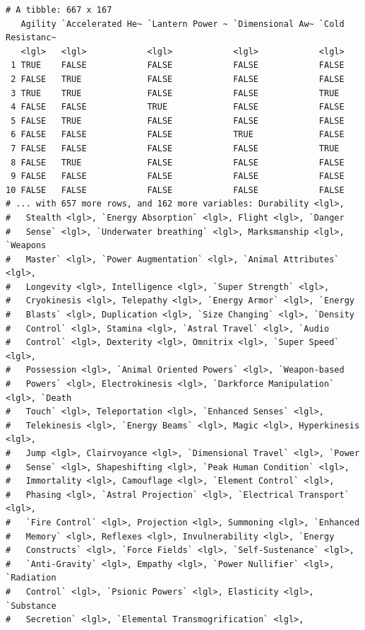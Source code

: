 \documentclass[
]{book}
\begin{document}
\begin{verbatim}
# A tibble: 667 x 167
   Agility `Accelerated He~ `Lantern Power ~ `Dimensional Aw~ `Cold Resistanc~
   <lgl>   <lgl>            <lgl>            <lgl>            <lgl>           
 1 TRUE    FALSE            FALSE            FALSE            FALSE           
 2 FALSE   TRUE             FALSE            FALSE            FALSE           
 3 TRUE    TRUE             FALSE            FALSE            TRUE            
 4 FALSE   FALSE            TRUE             FALSE            FALSE           
 5 FALSE   TRUE             FALSE            FALSE            FALSE           
 6 FALSE   FALSE            FALSE            TRUE             FALSE           
 7 FALSE   FALSE            FALSE            FALSE            TRUE            
 8 FALSE   TRUE             FALSE            FALSE            FALSE           
 9 FALSE   FALSE            FALSE            FALSE            FALSE           
10 FALSE   FALSE            FALSE            FALSE            FALSE           
# ... with 657 more rows, and 162 more variables: Durability <lgl>,
#   Stealth <lgl>, `Energy Absorption` <lgl>, Flight <lgl>, `Danger
#   Sense` <lgl>, `Underwater breathing` <lgl>, Marksmanship <lgl>, `Weapons
#   Master` <lgl>, `Power Augmentation` <lgl>, `Animal Attributes` <lgl>,
#   Longevity <lgl>, Intelligence <lgl>, `Super Strength` <lgl>,
#   Cryokinesis <lgl>, Telepathy <lgl>, `Energy Armor` <lgl>, `Energy
#   Blasts` <lgl>, Duplication <lgl>, `Size Changing` <lgl>, `Density
#   Control` <lgl>, Stamina <lgl>, `Astral Travel` <lgl>, `Audio
#   Control` <lgl>, Dexterity <lgl>, Omnitrix <lgl>, `Super Speed` <lgl>,
#   Possession <lgl>, `Animal Oriented Powers` <lgl>, `Weapon-based
#   Powers` <lgl>, Electrokinesis <lgl>, `Darkforce Manipulation` <lgl>, `Death
#   Touch` <lgl>, Teleportation <lgl>, `Enhanced Senses` <lgl>,
#   Telekinesis <lgl>, `Energy Beams` <lgl>, Magic <lgl>, Hyperkinesis <lgl>,
#   Jump <lgl>, Clairvoyance <lgl>, `Dimensional Travel` <lgl>, `Power
#   Sense` <lgl>, Shapeshifting <lgl>, `Peak Human Condition` <lgl>,
#   Immortality <lgl>, Camouflage <lgl>, `Element Control` <lgl>,
#   Phasing <lgl>, `Astral Projection` <lgl>, `Electrical Transport` <lgl>,
#   `Fire Control` <lgl>, Projection <lgl>, Summoning <lgl>, `Enhanced
#   Memory` <lgl>, Reflexes <lgl>, Invulnerability <lgl>, `Energy
#   Constructs` <lgl>, `Force Fields` <lgl>, `Self-Sustenance` <lgl>,
#   `Anti-Gravity` <lgl>, Empathy <lgl>, `Power Nullifier` <lgl>, `Radiation
#   Control` <lgl>, `Psionic Powers` <lgl>, Elasticity <lgl>, `Substance
#   Secretion` <lgl>, `Elemental Transmogrification` <lgl>,

\end{verbatim}
\end{document}
